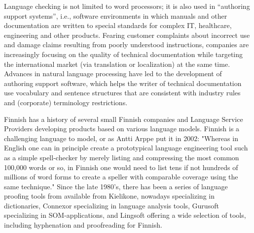 \documentclass[]{../../metanetpaper}
\begin{document}
\begin{multicols}{2}

Language checking is not limited to word processors; it is also used
in “authoring support systems”, i.e., software environments in which
manuals and other documentation are written to special standards for
complex IT, healthcare, engineering and other products. Fearing
customer complaints about incorrect use and damage claims resulting
from poorly understood instructions, companies are increasingly
focusing on the quality of technical documentation while targeting the
international market (via translation or localization) at the same
time. Advances in natural language processing have led to the
development of authoring support software, which helps the writer of
technical documentation use vocabulary and sentence structures that
are consistent with industry rules and (corporate) terminology
restrictions.


% 
% 
% 
% 
% 
% 
% 
% 
% 
% 
% 

Finnish has a history of several small Finnish companies and Language
Service Providers developing products based on various language
models. Finnish is a challenging language to model, or as Antti Arppe
put it in 2002: "Whereas in English one can in principle create a
prototypical language engineering tool such as a simple spell-checker
by merely listing and compressing the most common 100,000 words or so,
in Finnish one would need to list tens if not hundreds of millions of
word forms to create a speller with comparable coverage using the same
technique." \cite{NoPath} Since the late 1980's, there has been a
series of language proofing tools from available from Kielikone,
nowadays specializing in dictionaries, Connexor specializing in
language analysis tools, Gurusoft specializing in SOM-applications,
and Lingsoft offering a wide selection of tools,
including hyphenation and proofreading for Finnish.


\end{multicols}
\end{document}
